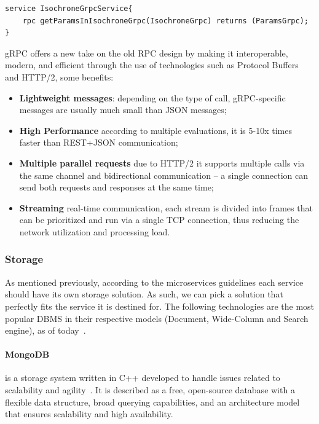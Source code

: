 \begin{lstlisting}
service IsochroneGrpcService{
    rpc getParamsInIsochroneGrpc(IsochroneGrpc) returns (ParamsGrpc);
}
\end{lstlisting}

gRPC offers a new take on the old RPC design by making it interoperable, modern, and efficient through the use of technologies such as Protocol Buffers and HTTP/2, some benefits:

\begin{itemize}
    \item \textbf{Lightweight messages}: depending on the type of call, gRPC-specific messages are usually much small than JSON messages;
    \item \textbf{High Performance} according to multiple evaluations, it is 5-10x times faster than REST+JSON communication;
    \item \textbf{Multiple parallel requests} due to HTTP/2 it supports multiple calls via the same channel and bidirectional communication -- a single connection can send both requests and responses at the same time;
    \item \textbf{Streaming} real-time communication, each stream is divided into frames that can be prioritized and run via a single TCP connection, thus reducing the network utilization and processing load.
\end{itemize}


\subsubsection{Storage}

As mentioned previously, according to the microservices guidelines each service should have its own storage solution. As such, we can pick a solution that perfectly fits the service it is destined for. The following technologies are the most popular DBMS in their respective models (Document, Wide-Column and Search engine), as of today~\cite{database-ranking}.

\paragraph{MongoDB} is a storage system written in C++ developed to handle issues related to scalability and agility~\cite{mongo-dev}. It is described as a free, open-source database with a flexible data structure, broad querying capabilities, and an architecture model that ensures scalability and high availability.

